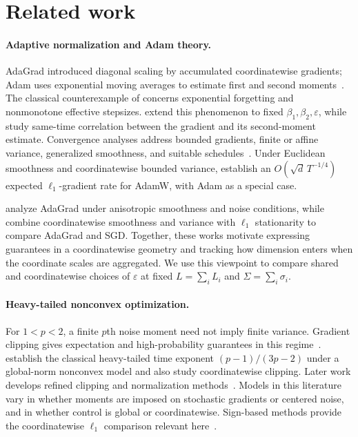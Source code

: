 \documentclass[11pt,letterpaper]{article}
\theoremstyle{definition}
\newcommand{\eps}{\varepsilon}
\begin{document}
\section{Related work}

\paragraph{Adaptive normalization and Adam theory.}
AdaGrad introduced diagonal scaling by accumulated coordinatewise gradients; Adam uses exponential moving averages to estimate first and second moments~\citep{duchi2011adaptive,kingma2015adam}. The classical counterexample of \citet{reddi2018convergence} concerns exponential forgetting and nonmonotone effective stepsizes. \citet{heilman2026adam} extend this phenomenon to fixed $\beta_1,\beta_2,\eps$, while \citet{zhou2018adashift} study same-time correlation between the gradient and its second-moment estimate. Convergence analyses address bounded gradients, finite or affine variance, generalized smoothness, and suitable schedules~\citep{chen2019convergence,defossez2022simple,zhang2022adam,hong2024convergence}. Under Euclidean smoothness and coordinatewise bounded variance, \citet{li2025adamw} establish an $O(\sqrt d\,T^{-1/4})$ expected $\ell_1$-gradient rate for AdamW, with Adam as a special case.

\citet{liu2025anisotropic} analyze AdaGrad under anisotropic smoothness and noise conditions, while \citet{jiang2025adagrad} combine coordinatewise smoothness and variance with $\ell_1$ stationarity to compare AdaGrad and SGD. Together, these works motivate expressing guarantees in a coordinatewise geometry and tracking how dimension enters when the coordinate scales are aggregated. We use this viewpoint to compare shared and coordinatewise choices of $\eps$ at fixed $L=\sum_iL_i$ and $\Sigma=\sum_i\sigma_i$.

\paragraph{Heavy-tailed nonconvex optimization.}
For $1<p<2$, a finite $p$th noise moment need not imply finite variance. Gradient clipping gives expectation and high-probability guarantees in this regime~\citep{zhang2020attention,cutkosky2021highprob}. \citet{zhang2020attention} establish the classical heavy-tailed time exponent $(p-1)/(3p-2)$ under a global-norm nonconvex model and also study coordinatewise clipping. Later work develops refined clipping and normalization methods~\citep{liu2023breaking,hubler2025normalization,liu2025heavy}. Models in this literature vary in whether moments are imposed on stochastic gradients or centered noise, and in whether control is global or coordinatewise. Sign-based methods provide the coordinatewise $\ell_1$ comparison relevant here~\citep{yu2026sign,yu2026openproblem}.
\end{document}
